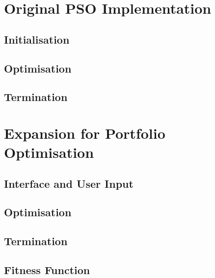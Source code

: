 \documentclass{pdfmx4020}
\begin{document}
  \section{Original PSO Implementation} %
  \label{sec:original_pso_implementation}

    \subsection{Initialisation} %
    \label{sub:initialisation}
    
    \subsection{Optimisation} %
    \label{sub:optimisation}
    
    \subsection{Termination} %
    \label{sub:termination}
    

  \section{Expansion for Portfolio Optimisation} %
  \label{sec:expansion_for_portfolio_optimisation}

    \subsection{Interface and User Input} %
    \label{sub:interface_and_user_input}
    
    \subsection{Optimisation} %
    \label{sub:optimisation}
    
    \subsection{Termination} %
    \label{sub:termination}
    
    \subsection{Fitness Function} %
    \label{sub:fitness_function}
    
\end{document}
